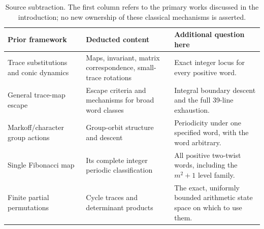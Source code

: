 \begin{table}[tb]
\centering\small
\begin{tabular}{@{}p{}p{}p{}@{}}
\toprule
Prior framework & Deducted content & Additional question here\\
\midrule
Trace substitutions and conic dynamics &
Maps, invariant, matrix correspondence, small-trace rotations &
Exact integer locus for every positive word.\\[2pt]
General trace-map escape &
Escape criteria and mechanisms for broad word classes &
Integral boundary descent and the full 39-line exhaustion.\\[2pt]
Markoff/character group actions &
Group-orbit structure and descent &
Periodicity under one specified word, with the word arbitrary.\\[2pt]
Single Fibonacci map &
Its complete integer periodic classification &
All positive two-twist words, including the $m^2+1$ level family.\\[2pt]
Finite partial permutations &
Cycle traces and determinant products &
The exact, uniformly bounded arithmetic state space on which to use them.\\
\bottomrule
\end{tabular}
\caption{Source subtraction. The first column refers to the primary
works discussed in the introduction; no new ownership of these
classical mechanisms is asserted.}
\label{tab:sources}
\end{table}
